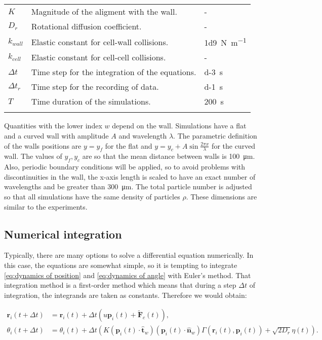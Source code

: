 \begin{table}[!h]
\begin{tabularx}{\textwidth}{lXl}
         $K$ & Magnitude of the aligment with the wall. & - \\ 
         $D_r$ & Rotational diffusion coefficient. & - \\ 
         $k_{wall}$ & Elastic constant for cell-wall collisions. & \SI[per-mode = symbol]{1d9}{\newton\per\meter} \\ 
         $k_{cell}$ & Elastic constant for cell-cell collisions. & - \\
         $\Delta t$ & Time step for the integration of the equations. & \SI{d-3}{\second} \\
         $\Delta t_r$ & Time step for the recording of data. & \SI{d-1}{\second} \\
         $T$ & Time duration of the simulations. & \SI{200}{\second} \\
    \hline\noalign{\smallskip}
    \end{tabularx}
    \label{table:model parameters}
\end{table}

Quantities with the lower index $w$ depend on the wall. Simulations have a flat and a curved wall with amplitude $A$ and wavelength $\lambda$. The parametric definition of the walls positions are $y=y_f$ for the flat and $y=y_c+A\sin{\frac{2\pi x}{\lambda}}$ for the curved wall. The values of $y_f, y_c$ are so that the mean distance between walls is \SI{100}{\micro\meter}. Also, periodic boundary conditions will be applied, so to avoid problems with discontinuities in the wall, the x-axis length is scaled to have an exact number of wavelengths and be greater than \SI{300}{\micro\meter}. The total particle number is adjusted so that all simulations have the same density of particles $\rho$. These dimensions are similar to the experiments.

\subsection{Numerical integration}

Typically, there are many options to solve a differential equation numerically. In this case, the equations are somewhat simple, so it is tempting to integrate \eqref{eq:dynamics of position} and \eqref{eq:dynamics of angle} with Euler's method. That integration method is a first-order method which means that during a step $\Delta t$ of integration, the integrands are taken as constants. Therefore we would obtain:

\begin{align}
    \textbf{r}_i(t+\Delta t) &=  \textbf{r}_i(t) + \Delta t(u \textbf{p}_i(t) + \tilde{\textbf{F}}_c(t)), \\
    \label{eq:wrong integration}
    \theta_i(t+\Delta t) &=  \theta_i(t) + \Delta t(K (\textbf{p}_i(t) \cdot \hat{\textbf{t}}_w)  (\textbf{p}_i(t) \cdot \hat{\textbf{n}}_w) \Gamma(\textbf{r}_i(t), \textbf{p}_i(t)) + \sqrt{2D_r}\eta(t)).
\end{align}

